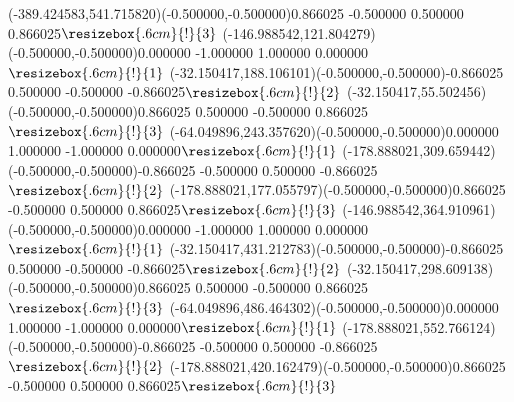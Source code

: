 \color{ASYcolor}
\fontsize{12.000000}{14.400000}\selectfont
\ASYalignT(-389.424583,541.715820)(-0.500000,-0.500000){0.866025 -0.500000 0.500000 0.866025}{$\resizebox{.6cm}{!}{3}$}%
\color{ASYcolor}
\fontsize{12.000000}{14.400000}\selectfont
\ASYalignT(-146.988542,121.804279)(-0.500000,-0.500000){0.000000 -1.000000 1.000000 0.000000}{$\resizebox{.6cm}{!}{1}$}%
\color{ASYcolor}
\fontsize{12.000000}{14.400000}\selectfont
\ASYalignT(-32.150417,188.106101)(-0.500000,-0.500000){-0.866025 0.500000 -0.500000 -0.866025}{$\resizebox{.6cm}{!}{2}$}%
\color{ASYcolor}
\fontsize{12.000000}{14.400000}\selectfont
\ASYalignT(-32.150417,55.502456)(-0.500000,-0.500000){0.866025 0.500000 -0.500000 0.866025}{$\resizebox{.6cm}{!}{3}$}%
\color{ASYcolor}
\fontsize{12.000000}{14.400000}\selectfont
\ASYalignT(-64.049896,243.357620)(-0.500000,-0.500000){0.000000 1.000000 -1.000000 0.000000}{$\resizebox{.6cm}{!}{1}$}%
\color{ASYcolor}
\fontsize{12.000000}{14.400000}\selectfont
\ASYalignT(-178.888021,309.659442)(-0.500000,-0.500000){-0.866025 -0.500000 0.500000 -0.866025}{$\resizebox{.6cm}{!}{2}$}%
\color{ASYcolor}
\fontsize{12.000000}{14.400000}\selectfont
\ASYalignT(-178.888021,177.055797)(-0.500000,-0.500000){0.866025 -0.500000 0.500000 0.866025}{$\resizebox{.6cm}{!}{3}$}%
\color{ASYcolor}
\fontsize{12.000000}{14.400000}\selectfont
\ASYalignT(-146.988542,364.910961)(-0.500000,-0.500000){0.000000 -1.000000 1.000000 0.000000}{$\resizebox{.6cm}{!}{1}$}%
\color{ASYcolor}
\fontsize{12.000000}{14.400000}\selectfont
\ASYalignT(-32.150417,431.212783)(-0.500000,-0.500000){-0.866025 0.500000 -0.500000 -0.866025}{$\resizebox{.6cm}{!}{2}$}%
\color{ASYcolor}
\fontsize{12.000000}{14.400000}\selectfont
\ASYalignT(-32.150417,298.609138)(-0.500000,-0.500000){0.866025 0.500000 -0.500000 0.866025}{$\resizebox{.6cm}{!}{3}$}%
\color{ASYcolor}
\fontsize{12.000000}{14.400000}\selectfont
\ASYalignT(-64.049896,486.464302)(-0.500000,-0.500000){0.000000 1.000000 -1.000000 0.000000}{$\resizebox{.6cm}{!}{1}$}%
\color{ASYcolor}
\fontsize{12.000000}{14.400000}\selectfont
\ASYalignT(-178.888021,552.766124)(-0.500000,-0.500000){-0.866025 -0.500000 0.500000 -0.866025}{$\resizebox{.6cm}{!}{2}$}%
\color{ASYcolor}
\fontsize{12.000000}{14.400000}\selectfont
\ASYalignT(-178.888021,420.162479)(-0.500000,-0.500000){0.866025 -0.500000 0.500000 0.866025}{$\resizebox{.6cm}{!}{3}$}%
